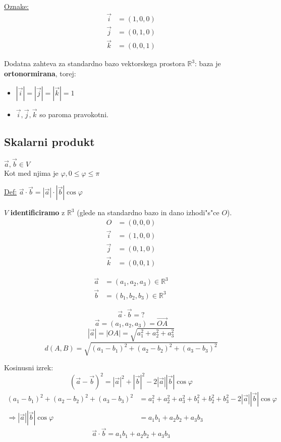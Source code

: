 \underline{Oznake:}
\begin{align*}
	\vec{i} &= (1, 0, 0)\\
	\vec{j} &= (0, 1, 0)\\
	\vec{k} &= (0, 0, 1)
\end{align*}

Dodatna zahteva za standardno bazo vektorskega prostora \(\mathbb{R}^3\):
\hspace*{12pt}baza je \textbf{ortonormirana}, torej:
\begin{itemize}
	\item \(|\vec{i}| = |\vec{j}| = |\vec{k}| = 1\)
	\item \(\vec{i}, \vec{j}, \vec{k}\) so paroma pravokotni.
\end{itemize}

\subsection{Skalarni produkt}
\(\vec{a}, \vec{b} \in V\)\\
Kot med njima je \(\varphi, 0 \leq \varphi \leq \pi\)

\underline{Def:} \(\vec{a} \cdot \vec{b} = |\vec{a}| \cdot |\vec{b}| \cos\varphi\)

\(V\) \textbf{identificiramo} z \(\mathbb{R}^3\) (glede na standardno bazo in dano izhodi"s"ce \(O\)).
\begin{align*}
	O &= (0, 0, 0)\\
	\vec{i} &= (1, 0, 0)\\
	\vec{j} &= (0, 1, 0)\\
	\vec{k} &= (0, 0, 1)
\end{align*}

\begin{align*}
	\vec{a} &= (a_1, a_2, a_3) \in \mathbb{R}^3\\
	\vec{b} &= (b_1, b_2, b_3) \in \mathbb{R}^3
\end{align*}

\[\vec{a} \cdot \vec{b} = ?\]
\[\vec{a} = (a_1, a_2, a_3) = \vec{OA}\]
\[|\vec{a}| = |OA| = \sqrt{a_1^2 + a_2^2 + a_3^2}\]
\[d(A, B) = \sqrt{(a_1 - b_1)^2 + (a_2 - b_2)^2 + (a_3 - b_3)^2}\]

Kosinusni izrek:
\[(\vec{a} - \vec{b})^2 = |\vec{a}|^2 + |\vec{b}|^2 - 2|\vec{a}||\vec{b}|\cos\varphi\]
\begin{align*}
	(a_1 - b_1)^2 + (a_2 - b_2)^2 + (a_3 - b_3)^2 &= a_1^2 + a_2^2 + a_3^2 + b_1^2 + b_2^2 + b_3^2 - 2|\vec{a}||\vec{b}|\cos\varphi\\
	\Rightarrow |\vec{a}||\vec{b}|\cos\varphi &= a_1b_1 + a_2b_2 + a_3b_3
\end{align*}
\[\vec{a} \cdot \vec{b} = a_1b_1 + a_2b_2 + a_3b_3\]

